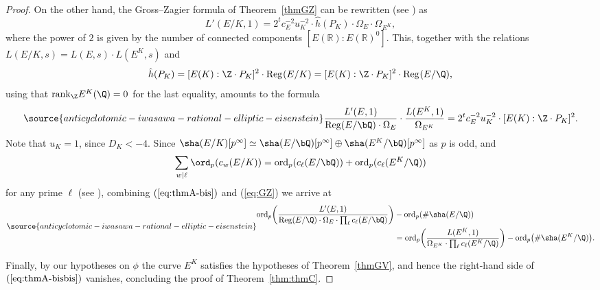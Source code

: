 \begin{proof}
On the other hand, the Gross--Zagier formula of Theorem~\ref{thmGZ} can be rewritten (see \cite[p.~312]{grosszagier}) as
\[
L'(E/K,1)=2^tc_E^{-2}u_K^{-2}\cdot\hat{h}(P_K)\cdot
\Omega_E\cdot\Omega_{E^K},
\]
where the power of $2$ is given by the number of connected components $[E(\mathbb{R}):E(\mathbb{R})^0]$.
This, together with the relations $L(E/K,s)=L(E,s)\cdot L(E^K,s)$ and
\[
\hat{h}(P_K)=[E(K):\Z\cdot P_K]^2\cdot{\rm Reg}_{}(E/K)=[E(K):\Z\cdot P_K]^2\cdot{\rm Reg}_{}(E/\Q),
\]
using that ${\rm rank}_\Z E^K(\Q)=0$ for the last equality, amounts to the formula
\begin{equation}\label{eq:GZ}
\source{anticyclotomic-iwasawa-rational-elliptic-eisenstein}
\frac{L'(E,1)}{{\rm Reg}(E/\bQ)\cdot\Omega_E}\cdot\frac{L(E^K,1)}{\Omega_{E^K}}=2^tc_E^{-2}u_K^{-2}\cdot[E(K):\Z\cdot P_K]^2.
\end{equation}
Note that $u_K=1$, since $D_K<-4$. Since $\sha(E/K)[p^\infty] \simeq\sha(E/\bQ)[p^\infty]\oplus\sha(E^K/\bQ)[p^\infty]$ as $p$ is odd, and
\[
\sum_{w\vert\ell}{\ord}_p(c_w(E/K))={\rm ord}_p(c_\ell(E/\bQ))+{\rm ord}_p(c_\ell(E^K/\Q))
\]
for any prime $\ell$ (see \cite[Cor.~9.2]{skinner-zhang}), combining $(\ref{eq:thmA-bis})$ and (\ref{eq:GZ}) we arrive at
\begin{equation}\label{eq:thmA-bisbis}
\source{anticyclotomic-iwasawa-rational-elliptic-eisenstein}
\begin{aligned}
{\rm ord}_p\biggl(\frac{L'(E,1)}{{\rm Reg}(E/\Q)\cdot\Omega_E\cdot\prod_\ell c_\ell(E/\bQ)}\biggr)&-{\rm ord}_p(\#\sha(E/\Q))\\
&=
{\rm ord}_p\biggl(\frac{L(E^K,1)}{\Omega_{E^K}\cdot\prod_\ell c_\ell(E^K/\Q)}\biggr)-{\rm ord}_p\bigl(\#\sha(E^K/\Q)\bigr).
\end{aligned}
\end{equation}

Finally, by our hypotheses on $\phi$ the curve $E^K$ satisfies the hypotheses of Theorem~\ref{thmGV}, and hence the right-hand side of $(\ref{eq:thmA-bisbis})$ vanishes, concluding the proof of Theorem~\ref{thm:thmC}.
\end{proof}
